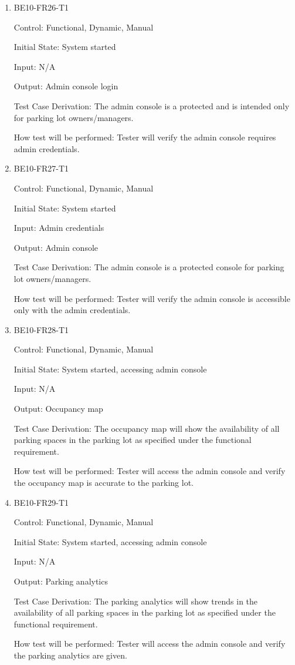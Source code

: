 \documentclass[12pt, titlepage]{article}
\begin{document}
\begin{enumerate}

    \item{BE10-FR26-T1}

    Control: Functional, Dynamic, Manual
    					
    Initial State: System started
    					
    Input: N/A
    					
    Output: Admin console login
    
    Test Case Derivation: The admin console is a protected and is intended only
    for parking lot owners/managers.
    					
    How test will be performed: Tester will verify the admin console requires
    admin credentials.

    \item{BE10-FR27-T1}

    Control: Functional, Dynamic, Manual
    					
    Initial State: System started
    					
    Input: Admin credentials
    					
    Output: Admin console
    
    Test Case Derivation: The admin console is a protected console for parking
    lot owners/managers.
    					
    How test will be performed: Tester will verify the admin console is
    accessible only with the admin credentials.

    \item{BE10-FR28-T1}

    Control: Functional, Dynamic, Manual
    					
    Initial State: System started, accessing admin console
    					
    Input: N/A
    					
    Output: Occupancy map
    
    Test Case Derivation: The occupancy map will show the availability of all
    parking spaces in the parking lot as specified under the functional
    requirement.
    					
    How test will be performed: Tester will access the admin console and verify
    the occupancy map is accurate to the parking lot.

    \item{BE10-FR29-T1}

    Control: Functional, Dynamic, Manual
    					
    Initial State: System started, accessing admin console
    					
    Input: N/A
    					
    Output: Parking analytics
    
    Test Case Derivation: The parking analytics will show trends in the
    availability of all parking spaces in the parking lot as specified under the
    functional requirement.
    					
    How test will be performed: Tester will access the admin console and verify
    the parking analytics are given.
\end{enumerate}
\end{document}
